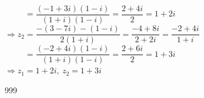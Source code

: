 \documentclass[a4paper]{article}
\begin{document}
$\phantom{\Rightarrow z_1}=\dfrac{(-1+3i)(1-i)}{(1+i)(1-i)}=\dfrac{2+4i}{2}=1+2i$\\

$\Rightarrow z_2=\dfrac{-(3-7i)-(1-i)}{2(1+i)}=\dfrac{-4+8i}{2+2i}=\dfrac{-2+4i}{1+i}$\\

$\phantom{\Rightarrow z_2}=\dfrac{(-2+4i)(1-i)}{(1+i)(1-i)}=\dfrac{2+6i}{2}=1+3i$\\

$\Rightarrow \boxed{z_1=1+2i,\ z_2=1+3i}$\\

\begin{thebibliography}{999}
\end{thebibliography}
\end{document}
